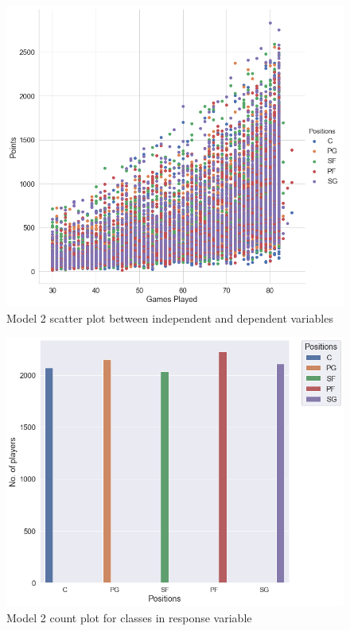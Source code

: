 \documentclass[format=sigconf]{acmart}
\begin{document}
\begin{figure}[H]
    \centering
    \includegraphics[scale=0.25]{model_2_scatter_plot.png}
    \caption{Model 2 scatter plot between independent and dependent variables}
    \label{fig:model2scatter}
\end{figure}
\begin{figure}[H]
    \centering
    \includegraphics[scale=0.25]{model_2_bar_plot.png}
    \caption{Model 2 count plot for classes in response variable}
    \label{fig:model2bar}
\end{figure}
\end{document}
